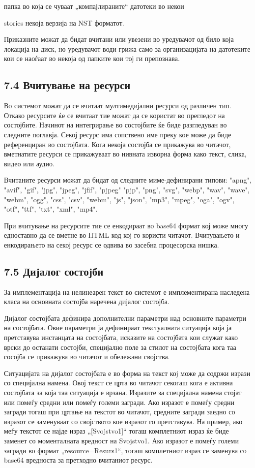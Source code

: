 папка во која се чуваат „компајлираните“ датотеки во некои

stories некоја верзија на NST форматот.

Приказните можат да бидат вчитани или увезени во уредувачот од било која локација на диск, но уредувачот води грижа само за организацијата на датотеките кои се наоѓаат во некоја од папките кои тој ги препознава.

\subsection{7.4 Вчитување на ресурси}

Во системот можат да се вчитаат мултимедијални ресурси од различен тип. Откако ресурсите ќе се вчитаат тие можат да се користат во прегледот на состојбите. Начинот на интегрирање во состојбите ќе биде разгледуван во следните поглавја. Секој ресурс има сопствено име преку кое може да биде референциран во состојбата. Кога некоја состојба се прикажува во читачот, вметнатите ресурси се прикажуваат во нивната изворна форма како текст, слика, видео или аудио.

Вчитаните ресурси можат да бидат од следните миме-дефинирани типови: "apng", "avif", "gif", "jpg", "jpeg", "jfif", "pjpeg" "pjp", "png", "svg", "webp", "wav", "wave", "webm", "ogg", "css", "csv", "webm", "js", "json", "mp3", "mpeg", "oga", "ogv", "otf", "ttf", "txt", "xml", "mp4".

При вчитување на ресурсите тие се енкодираат во base64 формат кој може многу едноставно да се вметне во HTML код кој го користи читачот. Вчитувањето и енкодирањето на секој ресурс се одвива во засебна процесорска нишка.

\subsection{7.5 Дијалог состојби}

За имплементација на нелинеарен текст во системот е имплементирана наследена класа на основната состојба наречена дијалог состојба.

Дијалог состојбата дефинира дополнителни параметри над основните параметри на состојбата. Овие параметри ја дефинираат текстуалната ситуација која ја претставува инстанцата на состојбата, исказите на состојбата кои служат како врски до останати состојби, специјално поле за стилот на состојбата кога таа сосојба се прикажува во читачот и обележани својства.

Ситуацијата на дијалог состојбата е во форма на текст кој може да содржи изрази со специјална намена. Овој текст се црта во читачот секогаш кога е активна состојбата за која таа ситуација е врзана. Изразите за специјална намена стојат или помеѓу средни или помеѓу големи загради. Ако изразот е помеѓу средни загради тогаш при цртање на текстот во читачот, средните загради заедно со изразот се заменуваат со својството кое изразот го претставува. На пример, ако меѓу текстот се најде израз „[Svojstvo1]“ тогаш комплетниот израз ќе биде заменет со моменталната вредност на Svojstvo1. Ако изразот е помеѓу големи загради во формат „resource=Resurs1“, тогаш комплетниот израз се заменува со base64 вредноста за претходно вчитаниот ресурс.


